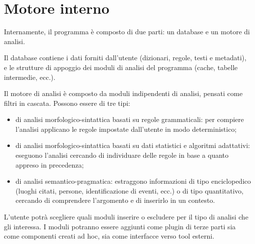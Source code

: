 \documentclass[twoside,stylearticle,12pt,filologia,it,article,xelatex,bibsection]{spinoza}
\begin{document}
\section{Motore interno}

Internamente, il programma è composto di due parti: un database e un
motore di analisi. 

Il database contiene i dati forniti dall'utente (dizionari, regole,
testi e metadati), e le strutture di appoggio dei moduli di analisi
del programma (cache, tabelle intermedie, ecc.).

Il motore di analisi è composto da moduli indipendenti di analisi,
pensati come filtri in cascata. Possono essere di tre tipi:
\begin{itemize}
\item di analisi morfologico-sintattica basati su regole grammaticali:
  per compiere l'analisi applicano le regole impostate dall'utente in
  modo deterministico;
\item di analisi morfologico-sintattica basati su dati statistici e
  algoritmi adattativi: eseguono l'analisi cercando di individuare
  delle regole in base a quanto appreso in precedenza;
\item di analisi semantico-pragmatica: estraggono informazioni di tipo
  enciclopedico (luoghi citati, persone, identificazione di eventi,
  ecc.) o di tipo quantitativo, cercando di comprendere l'argomento e
  di inserirlo in un contesto.
\end{itemize}

L'utente potrà scegliere quali moduli inserire o escludere per il tipo
di analisi che gli interessa. I moduli potranno essere aggiunti come
plugin di terze parti sia come componenti creati ad hoc, sia come
interfacce verso tool esterni.

\tableofcontents
\end{document}
